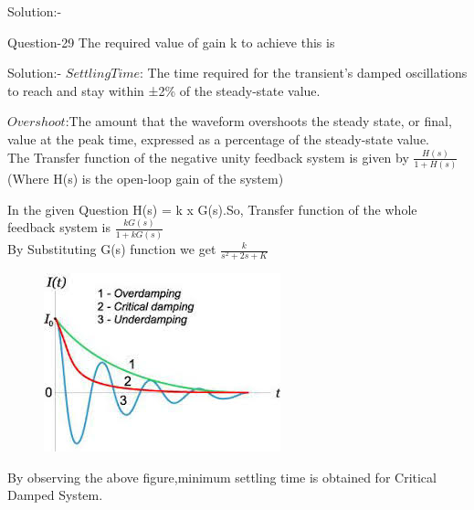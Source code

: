 \documentclass[journal,12pt,twocolumn]{IEEEtran}
\begin{document}
\begin{frame}{Solution:- }
\begin{frame}{Question-29 }
The required value of gain k to achieve this is \underline{\hspace{2cm}}

\end{frame}

\begin{frame}{Solution:- }
$Settling Time$: The time required for the transient's damped oscillations to
reach and stay within ±2\% of the steady-state value.\vspace{5mm}


$Overshoot$:The amount that the waveform overshoots the steady state, or final, value at the peak time, expressed as a percentage of the steady-state
value.\\
\vspace{5mm}
The Transfer function of the negative unity feedback system is given by \(\frac{H(s)}{1+H(s)}\) (Where H(s) is the open-loop gain of the system) \\
\end{frame}
\begin{frame}{}
    

In the given Question H(s) = k x G(s).So, Transfer function of the whole feedback system is \(\frac{kG(s)}{1+kG(s)}\) \\
By Substituting G(s) function we get \(\frac{k}{s^2+2s+K}\)
\begin{figure}[h]
    \includegraphics[scale=0.5]{./figs/fig-7.jpeg}

    
\end{figure}

By observing the above figure,minimum settling time is obtained for Critical Damped System.\\
\end{frame}


\end{frame}
\end{document}
